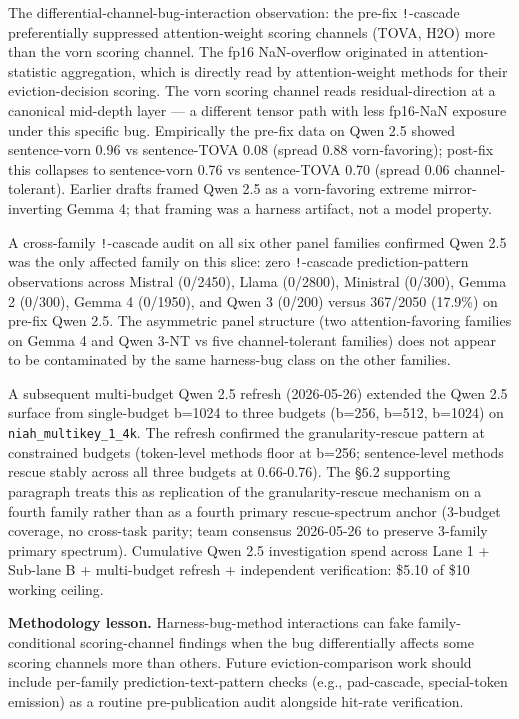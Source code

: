 \documentclass[10pt]{article}
\begin{document}
The differential-channel-bug-interaction observation: the pre-fix
\texttt{!}-cascade preferentially suppressed attention-weight scoring
channels (TOVA, H2O) more than the vorn scoring channel. The fp16
NaN-overflow originated in attention-statistic aggregation, which is
directly read by attention-weight methods for their eviction-decision
scoring. The vorn scoring channel reads residual-direction at a
canonical mid-depth layer --- a different tensor path with less
fp16-NaN exposure under this specific bug. Empirically the pre-fix
data on Qwen 2.5 showed sentence-vorn 0.96 vs sentence-TOVA 0.08
(spread 0.88 vorn-favoring); post-fix this collapses to sentence-vorn
0.76 vs sentence-TOVA 0.70 (spread 0.06 channel-tolerant). Earlier
drafts framed Qwen 2.5 as a vorn-favoring extreme mirror-inverting
Gemma 4; that framing was a harness artifact, not a model property.

A cross-family \texttt{!}-cascade audit on all six other panel
families confirmed Qwen 2.5 was the only affected family on this
slice: zero \texttt{!}-cascade prediction-pattern observations across
Mistral (0/2450), Llama (0/2800), Ministral (0/300), Gemma 2 (0/300),
Gemma 4 (0/1950), and Qwen 3 (0/200) versus 367/2050 (17.9\%) on
pre-fix Qwen 2.5. The asymmetric panel structure (two attention-favoring families on
Gemma 4 and Qwen 3-NT vs five channel-tolerant families) does not
appear to be contaminated by the same harness-bug class on the other
families.

A subsequent multi-budget Qwen 2.5 refresh (2026-05-26) extended the
Qwen 2.5 surface from single-budget b=1024
to three budgets (b=256, b=512, b=1024) on \texttt{niah\_multikey\_1\_4k}.
The refresh confirmed the granularity-rescue pattern at constrained
budgets (token-level methods floor at b=256; sentence-level methods
rescue stably across all three budgets at 0.66-0.76). The \S{}6.2
supporting paragraph treats this as replication of the
granularity-rescue mechanism on a fourth family rather than as a
fourth primary rescue-spectrum anchor (3-budget coverage, no
cross-task parity; team consensus 2026-05-26 to preserve 3-family
primary spectrum). Cumulative Qwen 2.5 investigation spend across
Lane 1 + Sub-lane B + multi-budget refresh + independent verification:
\$5.10 of \$10 working ceiling.

\textbf{Methodology lesson.} Harness-bug-method interactions can fake
family-conditional scoring-channel findings when the bug
differentially affects some scoring channels more than others. Future
eviction-comparison work should include per-family
prediction-text-pattern checks (e.g., pad-cascade, special-token
emission) as a routine pre-publication audit alongside hit-rate
verification.
\end{document}
